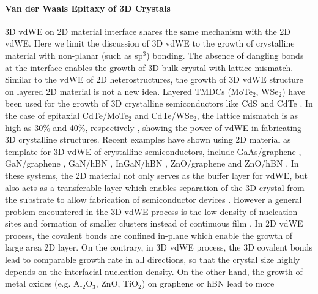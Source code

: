 \paragraph{Van der Waals Epitaxy of 3D Crystals}
\label{sec:orgeb0161b}

3D vdWE on 2D material interface shares the same mechanism with the 2D
vdWE. Here we limit the discussion of 3D vdWE to the growth of
crystalline material with non-planar (such as sp\(^{\text{3}}\)) bonding. The absence of dangling bonds at the
interface enables the growth of 3D bulk crystal with lattice
mismatch. Similar to the vdWE of 2D heterostructures, the growth of 3D
vdWE structure on layered 2D material is not a new idea. Layered TMDCs
(MoTe\(_{\text{2}}\), WSe\(_{\text{2}}\)) have been used for the growth of 3D crystalline
semiconductors like CdS and CdTe
\cite{Loeher_1994_vdw_epi_CdS_MoTe,Loeher_1996_CdTe_MoWTe}. In the case
of epitaxial CdTe/MoTe\(_{\text{2}}\) and CdTe/WSe\(_{\text{2}}\), the lattice mismatch is
as high as 30\% and 40\%, respectively \cite{Loeher_1996_CdTe_MoWTe},
showing the power of vdWE in fabricating 3D crystalline
structures. Recent examples have shown using 2D material as template
for 3D vdWE of crystalline semiconductors, include GaAs/graphene
\cite{Alaskar_2015_GaAs_gr_Si_theor,Kim_2017_remote_epi_Gr},
GaN/graphene
\cite{Chung_2010_GaN_ZnO_gr,Chung_2012_GaN_gr,Chung_2012_GaN_gr,Yoo_2013_GaN_gr_defect,Nepal_2013_GaN_gr,Kim_2014_direct_vdw_GaN_gr},
GaN/hBN \cite{Kobayashi_2012_GaN_hBN,Makimoto_2012_InGaN_hBN}, InGaN/hBN
\cite{Makimoto_2012_InGaN_hBN}, ZnO/graphene \cite{Chung_2010_GaN_ZnO_gr}
and ZnO/hBN \cite{Oh_2014_ZnO_hBN}. In these systems, the 2D material
not only serves as the buffer layer for vdWE, but also acts as a
transferable layer which enables separation of the 3D crystal from the
substrate to allow fabrication of semiconductor devices
\cite{Makimoto_2012_InGaN_hBN,Kobayashi_2012_GaN_hBN,Kim_2014_direct_vdw_GaN_gr,Kim_2017_remote_epi_Gr}.
However a general problem encountered in the 3D vdWE process is the
low density of nucleation sites and formation of smaller clusters
instead of continuous film
\cite{Loeher_1994_vdw_epi_CdS_MoTe,Loeher_1996_CdTe_MoWTe,Chung_2012_GaN_gr,Kobayashi_2012_GaN_hBN}.
In 2D vdWE process, the covalent bonds are confined in-plane which
enable the growth of large area 2D layer. On the contrary, in 3D vdWE
process, the 3D covalent bonds lead to comparable growth rate in all
directions, so that the crystal size highly depends on the interfacial
nucleation density. On the other hand, the growth of metal oxides
(e.g. Al\(_{\text{2}}\)O\(_{\text{3}}\), ZnO, TiO\(_{\text{2}}\)) on graphene or hBN lead to more

